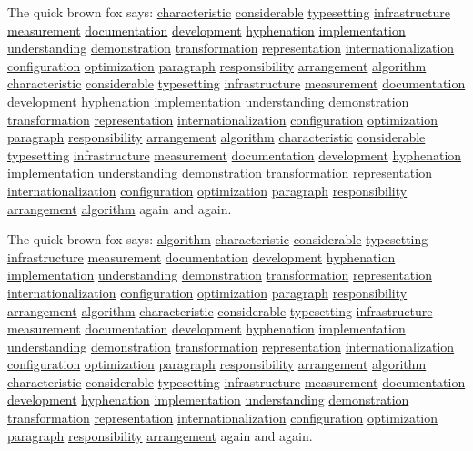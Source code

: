\documentclass{article}
\begin{document}
The quick brown fox says: \underline{characteristic} \underline{considerable} \underline{typesetting} \underline{infrastructure} \underline{measurement} \underline{documentation} \underline{development} \underline{hyphenation} \underline{implementation} \underline{understanding} \underline{demonstration} \underline{transformation} \underline{representation} \underline{internationalization} \underline{configuration} \underline{optimization} \underline{paragraph} \underline{responsibility} \underline{arrangement} \underline{algorithm} \underline{characteristic} \underline{considerable} \underline{typesetting} \underline{infrastructure} \underline{measurement} \underline{documentation} \underline{development} \underline{hyphenation} \underline{implementation} \underline{understanding} \underline{demonstration} \underline{transformation} \underline{representation} \underline{internationalization} \underline{configuration} \underline{optimization} \underline{paragraph} \underline{responsibility} \underline{arrangement} \underline{algorithm} \underline{characteristic} \underline{considerable} \underline{typesetting} \underline{infrastructure} \underline{measurement} \underline{documentation} \underline{development} \underline{hyphenation} \underline{implementation} \underline{understanding} \underline{demonstration} \underline{transformation} \underline{representation} \underline{internationalization} \underline{configuration} \underline{optimization} \underline{paragraph} \underline{responsibility} \underline{arrangement} \underline{algorithm} again and again.

The quick brown fox says: \underline{algorithm} \underline{characteristic} \underline{considerable} \underline{typesetting} \underline{infrastructure} \underline{measurement} \underline{documentation} \underline{development} \underline{hyphenation} \underline{implementation} \underline{understanding} \underline{demonstration} \underline{transformation} \underline{representation} \underline{internationalization} \underline{configuration} \underline{optimization} \underline{paragraph} \underline{responsibility} \underline{arrangement} \underline{algorithm} \underline{characteristic} \underline{considerable} \underline{typesetting} \underline{infrastructure} \underline{measurement} \underline{documentation} \underline{development} \underline{hyphenation} \underline{implementation} \underline{understanding} \underline{demonstration} \underline{transformation} \underline{representation} \underline{internationalization} \underline{configuration} \underline{optimization} \underline{paragraph} \underline{responsibility} \underline{arrangement} \underline{algorithm} \underline{characteristic} \underline{considerable} \underline{typesetting} \underline{infrastructure} \underline{measurement} \underline{documentation} \underline{development} \underline{hyphenation} \underline{implementation} \underline{understanding} \underline{demonstration} \underline{transformation} \underline{representation} \underline{internationalization} \underline{configuration} \underline{optimization} \underline{paragraph} \underline{responsibility} \underline{arrangement} again and again.
\end{document}
